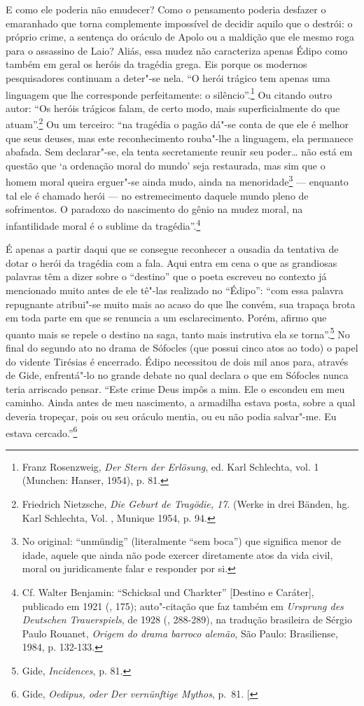 E como ele poderia não emudecer? Como o pensamento poderia desfazer o
emaranhado que torna complemente impossível de decidir aquilo que o destrói: o
próprio crime, a sentença do oráculo de Apolo ou a maldição que ele
mesmo roga para o assassino de Laio? Aliás, essa mudez não caracteriza
apenas Édipo como também em geral os heróis da tragédia grega. Eis
porque os modernos pesquisadores continuam a deter"-se nela. ``O herói
trágico tem apenas uma linguagem que lhe corresponde perfeitamente: o
silêncio''.\footnote{Franz Rosenzweig, \emph{Der Stern der
  Erlösung}, ed. Karl Schlechta, vol. 1 (Munchen: Hanser, 1954), p. 81. \versal{[N. E.]}}
Ou citando outro autor: ``Os heróis trágicos falam, de certo modo, mais
superficialmente do que atuam''.\footnote{Friedrich Nietzsche,
  \emph{Die Geburt de Tragödie, 17}. (Werke in drei Bänden, hg.
  Karl Schlechta, Vol. , Munique 1954, p. 94. \versal{[N. E.]}} Ou um terceiro: ``na
tragédia o pagão dá"-se conta de que ele é melhor que seus deuses, mas
este reconhecimento rouba"-lhe a linguagem, ela permanece abafada. Sem
declarar"-se, ela tenta secretamente reunir seu poder\ldots{} não está em
questão que `a ordenação moral do mundo' seja restaurada, mas sim que o
homem moral queira erguer"-se ainda mudo, ainda na menoridade\footnote{No original: ``unmündig'' (literalmente ``sem boca'') que significa
  menor de idade, aquele que ainda não pode exercer diretamente atos da
  vida civil, moral ou juridicamente falar e responder por si. \versal{[N. T.]}} ---
enquanto tal ele é chamado herói --- no estremecimento daquele mundo
pleno de sofrimentos. O paradoxo do nascimento do gênio na mudez moral,
na infantilidade moral é o sublime da tragédia''.\footnote{Cf.
  Walter Benjamin: ``Schicksal und Charkter'' {[}Destino e Caráter{]},
  publicado em 1921 (, 175); auto"-citação que faz também em
  \emph{Ursprung des Deutschen Trauerspiels}, de 1928 (, 288-289),
  na tradução brasileira de Sérgio Paulo Rouanet, \emph{Origem do drama
  barroco alemão}, São Paulo: Brasiliense, 1984, p. 132-133. \versal{[N. T.]}}

É apenas a partir daqui que se consegue reconhecer a ousadia da
tentativa de dotar o herói da tragédia com a fala. Aqui entra em cena o
que as grandiosas palavras têm a dizer sobre o ``destino'' que o poeta
escreveu no contexto já mencionado muito antes de ele tê"-las realizado
no ``Édipo'': ``com essa palavra repugnante atribui"-se muito mais ao
acaso do que lhe convém, sua trapaça brota em toda parte em que se
renuncia a um esclarecimento. Porém, afirmo que quanto mais se repele o
destino na saga, tanto mais instrutiva ela se torna''.\footnote{Gide, \emph{Incidences}, p. 81. \versal{[N. T.]}} No final do segundo ato no drama de
Sófocles (que possui cinco atos ao todo) o papel do vidente Tirésias é
encerrado. Édipo necessitou de dois mil anos para, através de Gide,
enfrentá"-lo no grande debate no qual declara o que em Sófocles nunca
teria arriscado pensar. ``Este crime Deus impôs a mim. Ele o escondeu em
meu caminho. Ainda antes de meu nascimento, a armadilha estava posta,
sobre a qual deveria tropeçar, pois ou seu oráculo mentia, ou eu não
podia salvar"-me. Eu estava cercado.''\footnote{Gide, \emph{Oedipus, oder Der vernünftige Mythos}, p.~81. {[}\versal{N. T.}{]}}

